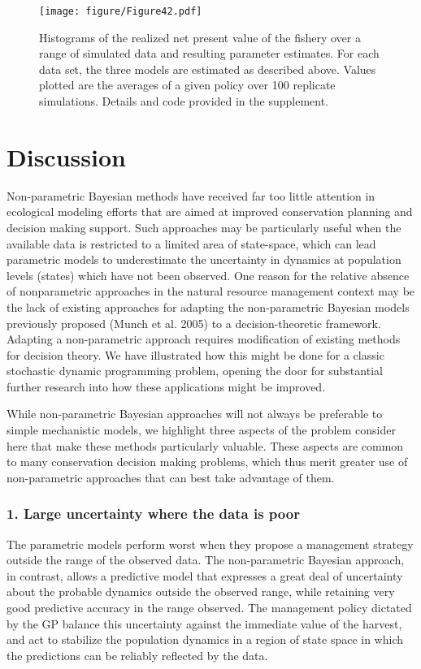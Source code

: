 \documentclass[author-year, review]{elsarticle} %
\makeatletter
\def\maxwidth{\ifdim\Gin@nat@width>\linewidth\linewidth
\else\Gin@nat@width\fi}
\let\Oldincludegraphics\includegraphics
\renewcommand{\includegraphics}[1]{\Oldincludegraphics[width=\maxwidth]{#1}}
\makeatother
\begin{document}
\begin{figure}[htbp]
\centering
\texttt{[image: figure/Figure42.pdf]}
\caption{Histograms of the realized net present value of the fishery
over a range of simulated data and resulting parameter estimates. For
each data set, the three models are estimated as described above. Values
plotted are the averages of a given policy over 100 replicate
simulations. Details and code provided in the supplement.}
\end{figure}

\section{Discussion}

Non-parametric Bayesian methods have received far too little attention
in ecological modeling efforts that are aimed at improved conservation
planning and decision making support. Such approaches may be
particularly useful when the available data is restricted to a limited
area of state-space, which can lead parametric models to underestimate
the uncertainty in dynamics at population levels (states) which have not
been observed. One reason for the relative absence of nonparametric
approaches in the natural resource management context may be the lack of
existing approaches for adapting the non-parametric Bayesian models
previously proposed (Munch et al. 2005) to a decision-theoretic
framework. Adapting a non-parametric approach requires modification of
existing methods for decision theory. We have illustrated how this might
be done for a classic stochastic dynamic programming problem, opening
the door for substantial further research into how these applications
might be improved.

While non-parametric Bayesian approaches will not always be preferable
to simple mechanistic models, we highlight three aspects of the problem
consider here that make these methods particularly valuable. These
aspects are common to many conservation decision making problems, which
thus merit greater use of non-parametric approaches that can best take
advantage of them.

\subsubsection{1. Large uncertainty where the data is poor}

The parametric models perform worst when they propose a management
strategy outside the range of the observed data. The non-parametric
Bayesian approach, in contrast, allows a predictive model that expresses
a great deal of uncertainty about the probable dynamics outside the
observed range, while retaining very good predictive accuracy in the
range observed. The management policy dictated by the GP balance this
uncertainty against the immediate value of the harvest, and act to
stabilize the population dynamics in a region of state space in which
the predictions can be reliably reflected by the data.
\end{document}
